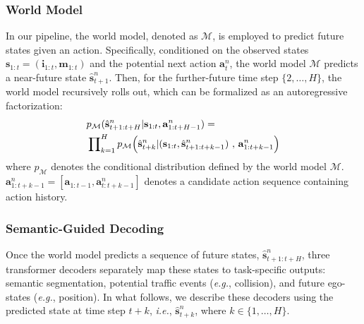 \documentclass[twocolumn]{template}
\theoremstyle{thmstyleone}%
\theoremstyle{thmstyletwo}%
\theoremstyle{thmstylethree}%
\begin{document}
\subsubsection{World Model}
In our pipeline,
the world model, denoted as $\mathcal{M}$, is employed to predict future states given an action.
Specifically,
conditioned on the observed states $\mathbf{s}_{1:t}\!=\!(\mathbf{i}_{1:t},\mathbf{m}_{1:t}\!)$ and the potential next action $\mathbf{a}^{n}_{t}$,
the world model $\mathcal{M}$ predicts a near-future state $\hat{\mathbf{s}}^{n}_{t+1}$.
Then, for the further-future time step $\{2,\dots,H\}$,
the world model recursively rolls out, which can be formalized as an autoregressive factorization:
\begin{equation}
\begin{aligned}
\setlength{\abovedisplayskip}{2pt}
&p_\mathcal{M}(\hat{\mathbf{s}}^{n}_{t+1:t+H}|\mathbf{s}_{1:t},\mathbf{a}^{n}_{1:t+H-1}) =\\
&\prod\nolimits_{k=1}^{H}
p_\mathcal{M}\Big(\hat{\mathbf{s}}^{n}_{t+k}| (\mathbf{s}_{1:t}, \hat{\mathbf{s}}^{n}_{t+1:t+k-1})\,\,,\, \mathbf{a}^{n}_{1:t+k-1}\Big)
\setlength{\abovedisplayskip}{2pt} 
\end{aligned}
\end{equation}
where $p_\mathcal{M}$ denotes the conditional distribution defined by the world model $\mathcal{M}$.
$\mathbf{a}^{n}_{1:t+k-1}=[\mathbf{a}_{1:t-1},\mathbf{a}^{n}_{t:t+k-1}]$ denotes a candidate action sequence containing action history.

\subsubsection{Semantic-Guided Decoding}
Once the world model predicts a sequence of future states, $\hat{\mathbf{s}}^{n}_{t+1:t+H}$,
three transformer decoders separately map these states to task-specific outputs:
semantic segmentation, potential traffic events (\emph{e.g.}, collision), and future ego-states (\emph{e.g.}, position).
In what follows, we describe these decoders using the predicted state at time step $t+k$, \emph{i.e.}, $\hat{\mathbf{s}}^{n}_{t+k}$, where $k \in \{1,\dots,H\}$.
\end{document}
